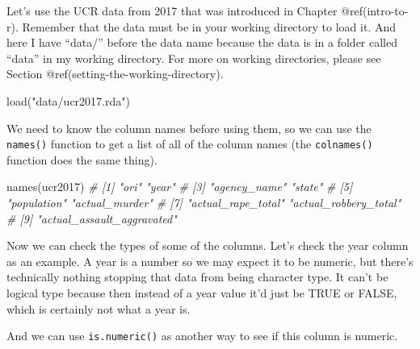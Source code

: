 \documentclass[
  a4paper,
]{krantz}
\makeatletter
\newenvironment{Shaded}{\begin{snugshade}}{\end{snugshade}}
\newcommand{\CommentTok}[1]{\textcolor[rgb]{0.56,0.35,0.01}{\textit{#1}}}
\newcommand{\FunctionTok}[1]{\textcolor[rgb]{0.00,0.00,0.00}{#1}}
\newcommand{\NormalTok}[1]{#1}
\newcommand{\SpecialCharTok}[1]{\textcolor[rgb]{0.00,0.00,0.00}{#1}}
\newcommand{\StringTok}[1]{\textcolor[rgb]{0.31,0.60,0.02}{#1}}
\newenvironment{kframe}{%
\medskip{}
\setlength{\fboxsep}{.8em}
 \def\at@end@of@kframe{}%
 \ifinner\ifhmode%
  \def\at@end@of@kframe{\end{minipage}}%
  \begin{minipage}{\columnwidth}%
 \fi\fi%
 \def\FrameCommand##1{\hskip\@totalleftmargin \hskip-\fboxsep
 \colorbox{shadecolor}{##1}\hskip-\fboxsep
     \hskip-\linewidth \hskip-\@totalleftmargin \hskip\columnwidth}%
 \MakeFramed {\advance\hsize-\width
   \@totalleftmargin\z@ \linewidth\hsize
   \@setminipage}}%
 {\par\unskip\endMakeFramed%
 \at@end@of@kframe}
\renewenvironment{Shaded}{\begin{kframe}}{\end{kframe}}
\makeatother
\begin{document}
Let's use the UCR data from 2017 that was introduced in
Chapter @ref(intro-to-r). Remember that the data must be in
your working directory to load it. And here I have ``data/''
before the data name because the data is in a folder called
``data'' in my working directory. For more on working
directories, please see Section
@ref(setting-the-working-directory).

\begin{Shaded}
\begin{Highlighting}[]
\FunctionTok{load}\NormalTok{(}\StringTok{"data/ucr2017.rda"}\NormalTok{)}
\end{Highlighting}
\end{Shaded}

We need to know the column names before using them, so we
can use the \texttt{names()} function to get a list of all
of the column names (the \texttt{colnames()} function does
the same thing).

\begin{Shaded}
\begin{Highlighting}[]
\FunctionTok{names}\NormalTok{(ucr2017)}
\CommentTok{\# [1] "ori"                       "year"                     }
\CommentTok{\# [3] "agency\_name"               "state"                    }
\CommentTok{\# [5] "population"                "actual\_murder"            }
\CommentTok{\# [7] "actual\_rape\_total"         "actual\_robbery\_total"     }
\CommentTok{\# [9] "actual\_assault\_aggravated"}
\end{Highlighting}
\end{Shaded}

Now we can check the types of some of the columns. Let's
check the year column as an example. A year is a number so
we may expect it to be numeric, but there's technically
nothing stopping that data from being character type. It
can't be logical type because then instead of a year value
it'd just be TRUE or FALSE, which is certainly not what a
year is.

\begin{Shaded}
\end{Shaded}

And we can use \texttt{is.numeric()} as another way to see
if this column is numeric.

\begin{Shaded}
\end{Shaded}
\end{document}
